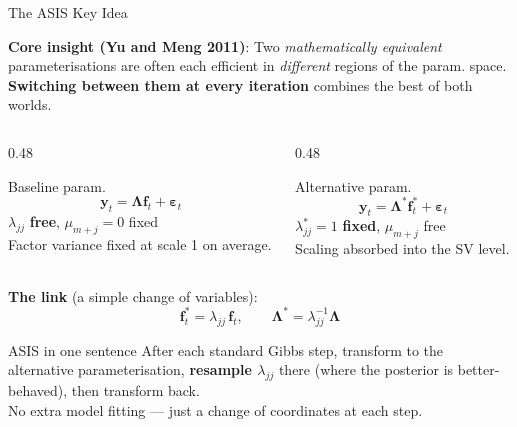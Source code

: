 \documentclass[10pt]{beamer}\usepackage[]{graphicx}\usepackage[table]{xcolor}
\begin{document}
\begin{frame}{The ASIS Key Idea}

  \textbf{Core insight (Yu and Meng 2011)}: Two \emph{mathematically equivalent}
  parameterisations are often each efficient in \emph{different} regions of
  the param. space.  \textbf{Switching between them at every iteration}
  combines the best of both worlds.

  \vspace{0.1em}

  \begin{columns}[T]
    \begin{column}{0.48\textwidth}
      \begin{block}{Baseline param.}
        \[
          \mathbf{y}_t = \boldsymbol{\Lambda}\mathbf{f}_t
          + \boldsymbol{\varepsilon}_t
        \]
        $\lambda_{jj}$ \textbf{free}, $\mu_{m+j}=0$ fixed\\[0.3em]
        Factor variance fixed at scale 1 on average.
      \end{block}
    \end{column}
    \begin{column}{0.48\textwidth}
      \begin{block}{Alternative param.}
        \[
          \mathbf{y}_t = \boldsymbol{\Lambda}^*\mathbf{f}_t^*
          + \boldsymbol{\varepsilon}_t
        \]
        $\lambda^*_{jj}=1$ \textbf{fixed}, $\mu_{m+j}$ free\\[0.3em]
        Scaling absorbed into the SV level.
      \end{block}
    \end{column}
  \end{columns}

  \vspace{0.1em}

  \textbf{The link} (a simple change of variables):
  \[
    \mathbf{f}_t^* = \lambda_{jj}\,\mathbf{f}_t,
    \qquad
    \boldsymbol{\Lambda}^* = \lambda_{jj}^{-1}\boldsymbol{\Lambda}
  \]

  \vspace{0.1em}

  \begin{alertblock}{ASIS in one sentence}
    After each standard Gibbs step, transform to the alternative
    parameterisation, \textbf{resample $\lambda_{jj}$} there (where the
    posterior is better-behaved), then transform back.\\
    No extra model fitting --- just a change of coordinates at each step.
  \end{alertblock}

\end{frame}
\end{document}

